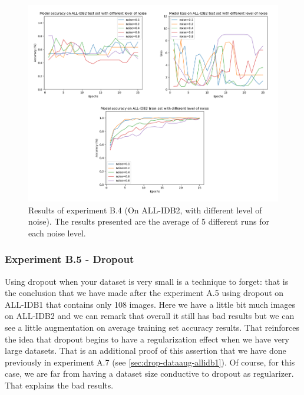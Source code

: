 \documentclass[11pt, openany]{report}
\theoremstyle{plain}
\theoremstyle{definition}
\theoremstyle{remark}
\begin{document}
\begin{figure}[H]
  \centering
  \includegraphics[scale=0.5]{Code/ch6-LeukemiaSubtypes/figures_result/ALL_IDB2/all_idb2-noise.PNG}
  \caption{Results of experiment B.4 (On ALL-IDB2, with different level of noise). The results presented are the average of 5 different runs for each noise level.}
  \label{fig:results-B4}
\end{figure}


\subsubsection{Experiment B.5 - Dropout}
Using dropout when your dataset is very small is a technique to forget: that is the conclusion that we have made after the experiment A.5 using dropout on ALL-IDB1 that contains only 108 images. Here we have a little bit much images on ALL-IDB2 and we can remark that overall it still has bad results but we can see a little augmentation on average training set accuracy results. That reinforces the idea that dropout begins to have a regularization effect when we have very large datasets. That is an additional proof of this assertion that we have done previously in experiment A.7 (see \autoref{sec:drop-dataaug-allidb1}). Of course, for this case, we are far from having a dataset size conductive to dropout as regularizer. That explains the bad results.  
\end{document}
